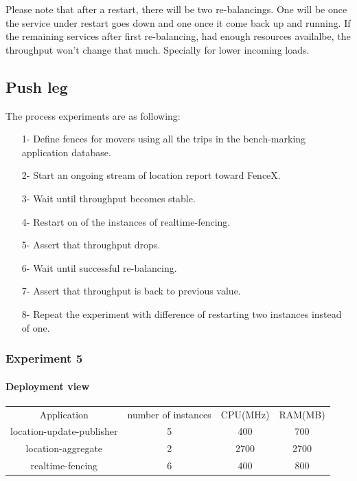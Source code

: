 \documentclass[a4]{report}
\begin{document}
    Please note that after a restart, there will be two re-balancings.
    One will be once the service under restart goes down and one once it come back up and running.
    If the remaining services after first re-balancing, had enough resources availalbe, the throughput won't change
    that much.
    Specially for lower incoming loads.

    \subsection{Push leg}
    The process experiments are as following:
    \begin{itemize}
        \item[1-] Define fences for movers using all the trips in the bench-marking application database.
        \item[2-] Start an ongoing stream of location report toward FenceX.
        \item[3-] Wait until throughput becomes stable.
        \item[4-] Restart on of the instances of realtime-fencing.
        \item[5-] Assert that throughput drops.
        \item[6-] Wait until successful re-balancing.
        \item[7-] Assert that throughput is back to previous value.
        \item[8-] Repeat the experiment with difference of restarting two instances instead of one.
    \end{itemize}

    \subsubsection{Experiment 5}
    \paragraph{Deployment view}
    \begin{center}
        \begin{tabular}{ c c c c }
            Application               &  number of instances     & CPU(MHz)  & RAM(MB)    \\
            location-update-publisher &          5               & 400       &   700      \\
            location-aggregate        &          2               & 2700      &   2700     \\
            realtime-fencing          &          6               & 400       &   800      \\
        \end{tabular}
    \end{center}
\end{document}
